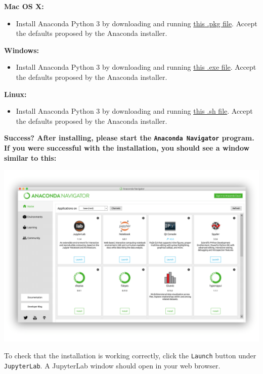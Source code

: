 \documentclass[
]{book}
\providecommand{\tightlist}{%
  \setlength{\itemsep}{0pt}\setlength{\parskip}{0pt}}
\begin{document}
\textbf{Mac OS X:}

\begin{itemize}
\tightlist
\item
  Install Anaconda Python 3 by downloading and running \href{https://repo.anaconda.com/archive/Anaconda3-2020.07-MacOSX-x86_64.pkg}{this .pkg file}. Accept the defaults proposed by the Anaconda installer.
\end{itemize}

\textbf{Windows:}

\begin{itemize}
\tightlist
\item
  Install Anaconda Python 3 by downloading and running \href{https://repo.anaconda.com/archive/Anaconda3-2020.07-Windows-x86_64.exe}{this .exe file}. Accept the defaults proposed by the Anaconda installer.
\end{itemize}

\textbf{Linux:}

\begin{itemize}
\tightlist
\item
  Install Anaconda Python 3 by downloading and running \href{https://repo.anaconda.com/archive/Anaconda3-2020.07-Linux-x86_64.sh}{this .sh file}. Accept the defaults proposed by the Anaconda installer.
\end{itemize}

\textbf{Success? After installing, please start the \texttt{Anaconda\ Navigator} program. If you were successful with the installation, you should see a window similar to this:}

\includegraphics{Python/PythonInstall/images/Anaconda_navigator.png}

To check that the installation is working correctly, click the \texttt{Launch} button under \texttt{JupyterLab}. A JupyterLab window should open in your web browser.
\end{document}
